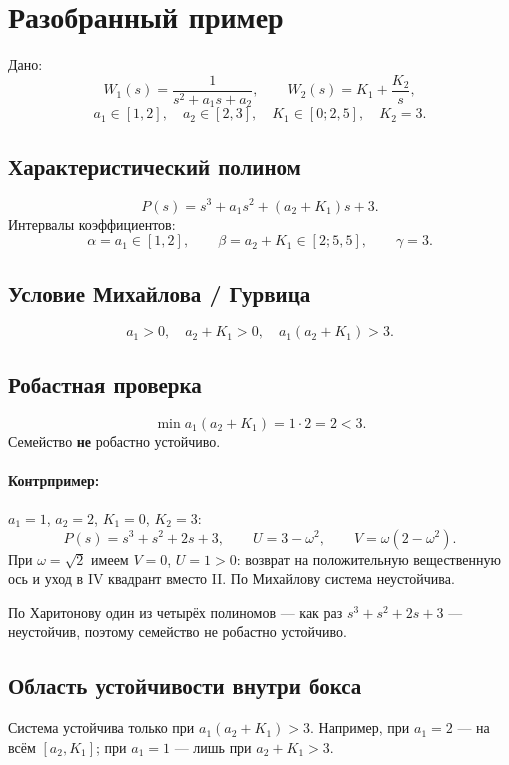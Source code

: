 \documentclass[11pt,a4paper]{article}
\begin{document}
\section{Разобранный пример}

Дано:
\[
W_1(s)=\frac{1}{s^2+a_1 s+a_2},\qquad
W_2(s)=K_1+\frac{K_2}{s},
\]
\[
a_1\in[1,2],\quad
a_2\in[2,3],\quad
K_1\in[0;2{,}5],\quad
K_2=3.
\]

\subsection{Характеристический полином}
\[
P(s)=s^3+a_1 s^2+(a_2+K_1)s+3.
\]
Интервалы коэффициентов:
\[
\alpha=a_1\in[1,2],\qquad
\beta=a_2+K_1\in[2;5{,}5],\qquad
\gamma=3.
\]

\subsection{Условие Михайлова / Гурвица}
\[
a_1>0,\quad a_2+K_1>0,\quad a_1(a_2+K_1)>3.
\]

\subsection{Робастная проверка}
\[
\min a_1(a_2+K_1)=1\cdot 2=2<3.
\]
Семейство \textbf{не} робастно устойчиво.

\paragraph{Контрпример:}
\(a_1=1\), \(a_2=2\), \(K_1=0\), \(K_2=3\):
\[
P(s)=s^3+s^2+2s+3,\qquad
U=3-\omega^2,\qquad
V=\omega(2-\omega^2).
\]
При \(\omega=\sqrt{2}\) имеем \(V=0\), \(U=1>0\): возврат на положительную вещественную ось
и уход в IV квадрант вместо II. По Михайлову система неустойчива.

По Харитонову один из четырёх полиномов --- как раз \(s^3+s^2+2s+3\) --- неустойчив,
поэтому семейство не робастно устойчиво.

\subsection{Область устойчивости внутри бокса}
Система устойчива только при \(a_1(a_2+K_1)>3\).
Например, при \(a_1=2\) --- на всём \([a_2,K_1]\);
при \(a_1=1\) --- лишь при \(a_2+K_1>3\).

\end{document}
